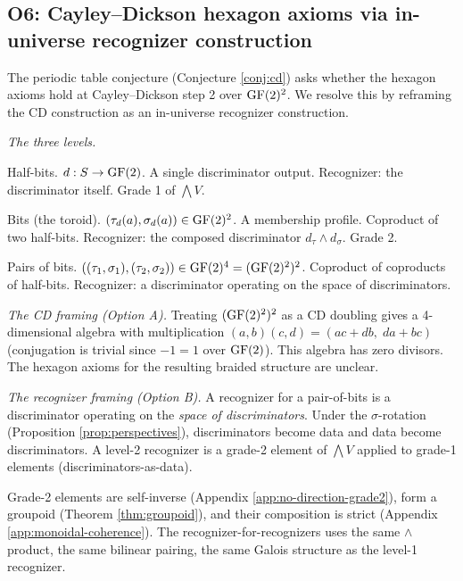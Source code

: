 \subsection{O6: Cayley--Dickson hexagon axioms via
  in-universe recognizer construction}
\label{app:cd-recognizer}

The periodic table conjecture (Conjecture \ref{conj:cd})
asks whether the hexagon axioms hold at Cayley--Dickson
step 2 over $\operatorname{GF}(2)^2$. We resolve this by reframing
the CD construction as an in-universe recognizer
construction.

\emph{The three levels.}
\begin{description}[nosep,leftmargin=1cm]
  \item[Level 0] Half-bits. $d: S \to \operatorname{GF}(2)$. A single
    discriminator output. Recognizer: the discriminator
    itself. Grade 1 of $\bigwedge V$.
  \item[Level 1] Bits (the toroid). $(\tau_d(a),
    \sigma_d(a)) \in \operatorname{GF}(2)^2$. A membership profile.
    Coproduct of two half-bits. Recognizer: the composed
    discriminator $d_\tau \wedge d_\sigma$. Grade 2.
  \item[Level 2] Pairs of bits.
    $((\tau_1, \sigma_1), (\tau_2, \sigma_2)) \in
    \operatorname{GF}(2)^4 = (\operatorname{GF}(2)^2)^2$. Coproduct of coproducts
    of half-bits. Recognizer: a discriminator operating
    on the space of discriminators.
\end{description}

\emph{The CD framing (Option A).}
Treating $(\operatorname{GF}(2)^2)^2$ as a CD doubling gives a
4-dimensional algebra with multiplication
$(a,b)(c,d) = (ac + db,\; da + bc)$ (conjugation is
trivial since $-1 = 1$ over $\operatorname{GF}(2)$). This algebra
has zero divisors. The hexagon axioms for the resulting
braided structure are unclear.

\emph{The recognizer framing (Option B).}
A recognizer for a pair-of-bits is a discriminator
operating on the \emph{space of discriminators}. Under
the $\sigma$-rotation (Proposition \ref{prop:perspectives}),
discriminators become data and data become discriminators.
A level-2 recognizer is a grade-2 element of $\bigwedge V$
applied to grade-1 elements (discriminators-as-data).

Grade-2 elements are self-inverse (Appendix
\ref{app:no-direction-grade2}), form a groupoid
(Theorem \ref{thm:groupoid}), and their composition
is strict (Appendix \ref{app:monoidal-coherence}). The
recognizer-for-recognizers uses the same $\wedge$
product, the same bilinear pairing, the same Galois
structure as the level-1 recognizer.

